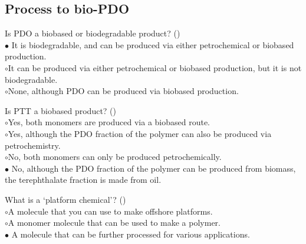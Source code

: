 \documentclass[]{beamer}
\begin{document}
\begin{CJK}{UTF8}{gbsn}
\subsection{Process to bio-PDO}
\setcounter{questions}{0}


\begin{frame}[shrink] {} 
\addtocounter{questions}{1}
\color{blue}
  Is PDO a biobased or biodegradable product?
 ({})\\
\color{black}
\setlength{\parindent}{-0.4cm}
{\color{red}$\bullet$} It is biodegradable, and can be produced via either petrochemical or biobased production.  \\
{\color{red}$\circ$}It can be produced via either petrochemical or biobased production, but it is not biodegradable.   \\
{\color{red}$\circ$}None, although PDO can be produced via biobased production.  \\
\end{frame}


\begin{frame}[shrink] {} 
\addtocounter{questions}{1}
\color{blue}
  Is PTT a biobased product?
 ({})\\
\color{black}
\setlength{\parindent}{-0.4cm}
{\color{red}$\circ$}Yes, both monomers are produced via a biobased route.  \\
{\color{red}$\circ$}Yes, although the PDO fraction of the polymer can also be produced via petrochemistry.   \\
{\color{red}$\circ$}No, both monomers can only be produced petrochemically.   \\
{\color{red}$\bullet$} No, although the PDO fraction of the polymer can be produced from biomass, the terephthalate fraction is made from oil.   \\
\end{frame}


\begin{frame}[shrink] {} 
\addtocounter{questions}{1}
\color{blue}
  What is a ‘platform chemical’?
 ({})\\
\color{black}
\setlength{\parindent}{-0.4cm}
{\color{red}$\circ$}A molecule that you can use to make offshore platforms.  \\
{\color{red}$\circ$}A monomer molecule that can be used to make a polymer.   \\
{\color{red}$\bullet$} A molecule that can be further processed for various applications.  \\
\end{frame}



\end{CJK}
\end{document}
